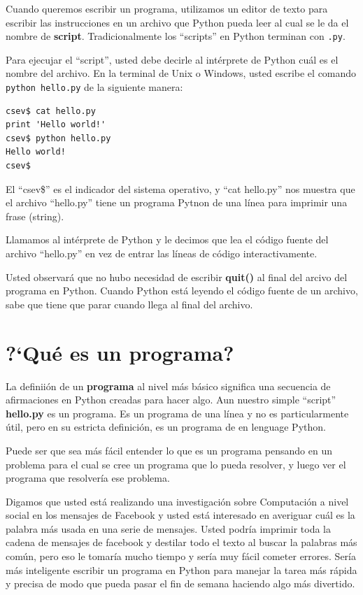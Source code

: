 Cuando queremos escribir un programa, utilizamos un editor de texto para escribir las instrucciones en un archivo que Python pueda leer al cual se le da el nombre de {\bf script}. Tradicionalmente los ``scripts'' en Python terminan con {\tt .py}.


Para ejecujar el ``script'', usted debe decirle al int\'erprete de Python cu\'al es el nombre del archivo.  
En la terminal de Unix o Windows, usted escribe el comando {\tt python hello.py} de la siguiente manera:

\beforeverb
\begin{verbatim}
csev$ cat hello.py
print 'Hello world!'
csev$ python hello.py
Hello world!
csev$
\end{verbatim}
\afterverb
%
El ``csev\$'' es el indicador del sistema operativo, y ``cat hello.py'' nos muestra que el archivo 
``hello.py'' tiene un programa Pytnon de una l\'inea para imprimir una frase (string).

Llamamos al int\'erprete de Python y le decimos que lea el c\'odigo fuente del archivo
``hello.py'' en vez de entrar las l\'ineas de c\'odigo interactivamente.

Usted observar\'a que no hubo necesidad de escribir {\bf quit()} al final del arcivo del programa 
en Python. Cuando Python est\'a leyendo el c\'odigo fuente de un archivo, sabe que tiene que parar cuando llega al final del archivo.

\section{?`Qu\'e es un programa?}

La definii\'on de un {\bf programa} al nivel m\'as b\'asico significa una secuencia de afirmaciones en Python creadas para hacer algo.
Aun nuestro simple ``script'' {\bf hello.py}  es un programa. Es un programa de una l\'inea y no es particularmente \'util, pero en su estricta definici\'on, es un programa de en lenguage Python.

Puede ser que sea m\'as f\'acil entender lo que es un programa pensando en un problema para el cual se cree un programa que lo pueda resolver, y luego ver el programa que resolver\'ia ese problema.

Digamos que usted est\'a realizando una investigaci\'on sobre Computaci\'on a nivel social en los mensajes de Facebook y usted est\'a interesado en averiguar cu\'al es la palabra m\'as usada en una serie de mensajes.
Usted podr\'ia imprimir toda la cadena de mensajes de facebook y destilar todo el texto al buscar la palabras m\'as com\'un, pero eso le tomar\'ia mucho tiempo y ser\'ia muy f\'acil cometer errores. Ser\'ia m\'as inteligente escribir un programa en Python para manejar la tarea m\'as r\'apida y precisa de modo que pueda pasar el fin de semana haciendo algo m\'as divertido.

